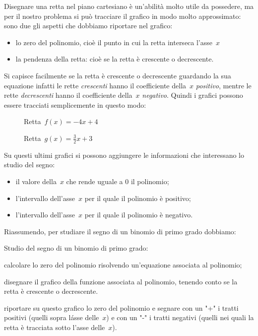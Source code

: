 Disegnare una retta nel piano cartesiano è un'abilità molto utile da 
possedere, ma per il nostro problema si può tracciare il grafico in modo 
molto approssimato: sono due gli aspetti che dobbiamo riportare nel grafico:

\begin{itemize}
 \item 
  lo zero del polinomio, cioè il punto in cui la retta interseca l'asse~$x$
 \item
  la pendenza della retta: cioè se la retta è crescente o decrescente.
\end{itemize}

Si capisce facilmente se la retta è crescente o decrescente guardando la sua 
equazione infatti le rette \emph{crescenti} hanno il coefficiente della~$x$ 
\emph{positivo}, mentre le rette \emph{decrescenti} hanno il coefficiente 
della~$x$ \emph{negativo}.
Quindi i grafici possono essere tracciati semplicemente in questo modo:

\begin{inaccessibleblock}
 \begin{figure}[h]
 \centering
 \begin{minipage}[]{.45\textwidth}
  \centering
  \caption{Retta~$f(x) = -4 x +4$}
 \end{minipage}
 \begin{minipage}[]{.45\textwidth}
  \centering
  \caption{Retta~$g(x) = \frac{3}{2} x +3$}
 \end{minipage}
\end{figure}
\end{inaccessibleblock}

Su questi ultimi grafici si possono aggiungere le informazioni che 
interessano lo studio del segno:

\begin{itemize}
 \item il valore della~$x$ che rende uguale a 0 il polinomio;
 \item l'intervallo dell'asse~$x$ per il quale il polinomio è positivo;
 \item l'intervallo dell'asse~$x$ per il quale il polinomio è negativo.
\end{itemize}

Riassumendo, per studiare il segno di un binomio di primo grado dobbiamo: 

\begin{procedura}
 Studio del segno di un binomio di primo grado:
\begin{enumeratea}
\item calcolare lo zero del polinomio risolvendo un'equazione associata al 
 polinomio;
\item disegnare il grafico della funzione associata al polinomio, 
 tenendo conto se la retta è crescente o decrescente.
\item riportare su questo grafico lo zero del polinomio e segnare con un 
 "+" i tratti positivi (quelli sopra l\'asse delle~$x$) e con un "-" i tratti 
 negativi (quelli nei quali la retta è tracciata sotto l'asse delle~$x$).
\end{enumeratea}
\end{procedura}


